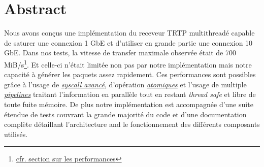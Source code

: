 \documentclass[8pt]{article}
\begin{document}

\newpage

\section{Abstract}

Nous avons conçus une implémentation du receveur TRTP multithreadé capable de saturer une connexion 1 GbE et d'utiliser en grande partie une connexion 10 GbE.
Dans nos tests, la vitesse de transfer maximale observée était de 700 MiB/s\footnote{\hyperref[sec:performance]{cfr. section sur les performances}}. Et celle-ci
n'était limitée non pas par notre implémentation mais notre capacité à générer les paquets assez rapidement. Ces performances sont possibles grâce à l'usage de 
\textit{\hyperref[sec:syscalls]{syscall avancé}}, d'opération \textit{\hyperref[sec:atomics]{atomiques}} et l'usage de multiple \textit{\hyperref[sec:pipelines]{pipelines}} traitant
l'information en parallèle tout en restant \textit{thread safe} et libre de toute fuite mémoire. De plus notre implémentation est accompagnée d'une suite
étendue de tests couvrant la grande majorité du code et d'une documentation complète détaillant l'architecture and le fonctionnement des différents composants
utilisés.

\newpage

\tableofcontents
\newpage


\newpage


\newpage


\newpage



\end{document}
